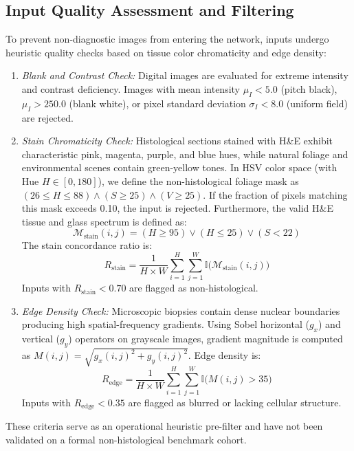 \documentclass[conference]{IEEEtran}
\begin{document}
\subsection{Input Quality Assessment and Filtering}
To prevent non-diagnostic images from entering the network, inputs undergo heuristic quality checks based on tissue color chromaticity and edge density:
\begin{enumerate}
    \item \textit{Blank and Contrast Check:} Digital images are evaluated for extreme intensity and contrast deficiency. Images with mean intensity $\mu_I < 5.0$ (pitch black), $\mu_I > 250.0$ (blank white), or pixel standard deviation $\sigma_I < 8.0$ (uniform field) are rejected.
    \item \textit{Stain Chromaticity Check:} Histological sections stained with H\&E exhibit characteristic pink, magenta, purple, and blue hues, while natural foliage and environmental scenes contain green-yellow tones. In HSV color space (with Hue $H \in [0, 180]$), we define the non-histological foliage mask as $(26 \le H \le 88) \land (S \ge 25) \land (V \ge 25)$. If the fraction of pixels matching this mask exceeds 0.10, the input is rejected. Furthermore, the valid H\&E tissue and glass spectrum is defined as:
    \begin{equation}
    \label{eq:stain_mask}
    \mathcal{M}_{\text{stain}}(i,j) = (H \ge 95) \lor (H \le 25) \lor (S < 22)
    \end{equation}
    The stain concordance ratio is:
    \begin{equation}
    \label{eq:stain_ratio}
    R_{\text{stain}} = \frac{1}{H \times W} \sum_{i=1}^H \sum_{j=1}^W \mathbb{I}\big(\mathcal{M}_{\text{stain}}(i,j)\big)
    \end{equation}
    Inputs with $R_{\text{stain}} < 0.70$ are flagged as non-histological.
    \item \textit{Edge Density Check:} Microscopic biopsies contain dense nuclear boundaries producing high spatial-frequency gradients. Using Sobel horizontal ($g_x$) and vertical ($g_y$) operators on grayscale images, gradient magnitude is computed as $M(i,j) = \sqrt{g_x(i,j)^2 + g_y(i,j)^2}$. Edge density is:
    \begin{equation}
    \label{eq:edge_density}
    R_{\text{edge}} = \frac{1}{H \times W} \sum_{i=1}^H \sum_{j=1}^W \mathbb{I}\big(M(i,j) > 35\big)
    \end{equation}
    Inputs with $R_{\text{edge}} < 0.35$ are flagged as blurred or lacking cellular structure.
\end{enumerate}
These criteria serve as an operational heuristic pre-filter and have not been validated on a formal non-histological benchmark cohort.
\end{document}
